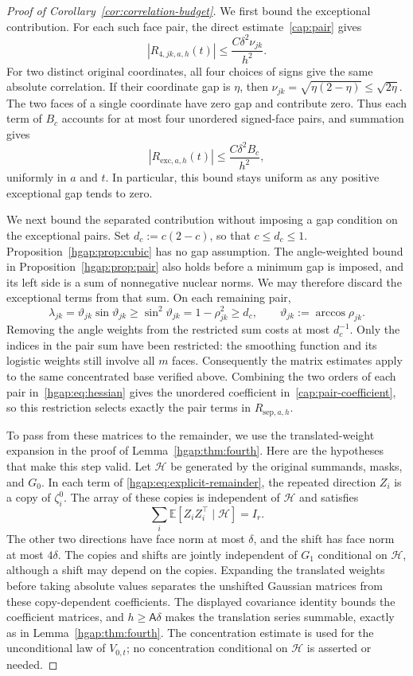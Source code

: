 \documentclass[11pt,letterpaper]{article}
\theoremstyle{remark}
\newcommand{\E}{\mathbb E}
\begin{document}
\begin{proof}[Proof of Corollary~\ref{cor:correlation-budget}]
We first bound the exceptional contribution. For each such face
pair, the direct estimate~\eqref{cap:pair} gives
\[
 |R_{4,jk,a,h}(t)|\le\frac{C\delta^2\nu_{jk}}{h^2}.
\]
For two distinct original coordinates, all four choices of signs
give the same absolute correlation. If their coordinate gap is
$\eta$, then
$\nu_{jk}=\sqrt{\eta(2-\eta)}\le\sqrt{2\eta}$.
The two faces of a single coordinate have zero gap and contribute
zero. Thus each term of $B_c$ accounts for at most four unordered
signed-face pairs, and summation gives
\begin{equation}
 |R_{\mathrm{exc},a,h}(t)|
 \le\frac{C\delta^2B_c}{h^2},
 \label{budget:eq:exceptional}
\end{equation}
uniformly in $a$ and $t$. In particular, this bound stays uniform
as any positive exceptional gap tends to zero.

We next bound the separated contribution without imposing a gap
condition on the exceptional pairs. Set $d_c:=c(2-c)$, so that
$c\le d_c\le1$. Proposition~\ref{hgap:prop:cubic} has no gap
assumption. The angle-weighted bound in
Proposition~\ref{hgap:prop:pair} also holds before a minimum gap
is imposed, and its left side is a sum of nonnegative nuclear
norms. We may therefore discard the exceptional terms from that
sum. On each remaining pair,
\[
 \lambda_{jk}=\vartheta_{jk}\sin\vartheta_{jk}
 \ge\sin^2\vartheta_{jk}
 =1-\rho_{jk}^2\ge d_c,
 \qquad \vartheta_{jk}:=\arccos\rho_{jk}.
\]
Removing the angle weights from the restricted sum costs at most
$d_c^{-1}$. Only the indices in the pair sum have been restricted:
the smoothing function and its logistic weights still involve
all $m$ faces. Consequently the matrix estimates apply to the
same concentrated base verified above. Combining the two orders
of each pair in~\eqref{hgap:eq:hessian} gives the unordered
coefficient in~\eqref{cap:pair-coefficient}, so this restriction
selects exactly the pair terms in $R_{\mathrm{sep},a,h}$.

To pass from these matrices to the remainder, we use the
translated-weight expansion in the proof of
Lemma~\ref{hgap:thm:fourth}. Here are the hypotheses that make this
step valid. Let $\mathcal H$ be generated by the original summands,
masks, and $G_0$. In each term of
\eqref{hgap:eq:explicit-remainder}, the repeated direction $Z_i$
is a copy of $\zeta_i^0$. The array of these copies is independent
of $\mathcal H$ and satisfies
\[
 \sum_i\E[Z_iZ_i^\top\mid\mathcal H]=I_r.
\]
The other two directions have face norm at most $\delta$, and
the shift has face norm at most $4\delta$. The copies and shifts
are jointly independent of $G_1$ conditional on $\mathcal H$,
although a shift may depend on the copies. Expanding the translated
weights before taking absolute values separates the unshifted
Gaussian matrices from these copy-dependent coefficients. The
displayed covariance identity bounds the coefficient matrices,
and $h\ge\mathsf A\delta$ makes the translation series summable,
exactly as in Lemma~\ref{hgap:thm:fourth}. The concentration estimate
is used for the unconditional law of $V_{0,t}$; no concentration
conditional on $\mathcal H$ is asserted or needed.


\end{proof}
\end{document}
